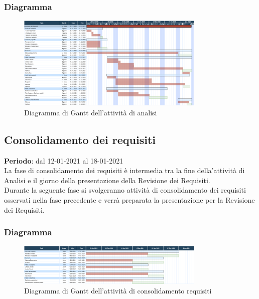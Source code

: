 	\subsubsection{Diagramma}
		\begin{figure}[H]
        		\centering
        		\includegraphics[width=0.8\textwidth]{source/img/analisiattivita.png}
        		\caption{Diagramma di Gantt dell'attività di analisi}
    		\end{figure}

	\subsection{Consolidamento dei requisiti}
	\textbf{Periodo}: dal 12-01-2021 al 18-01-2021 \\
	La fase di consolidamento dei requisiti è intermedia tra la fine della'attività di Analisi e il giorno della presentazione della Revisione dei Requisiti. \\
	Durante la seguente fase si svolgeranno attività di consolidamento dei requisiti osservati nella fase precedente e verrà preparata la presentazione per la Revisione dei Requisiti.
	
	\subsubsection{Diagramma}
		\begin{figure}[H]
        		\centering
        		\includegraphics[width=0.8\textwidth]{source/img/Consolidamento_Requisiti.png}
        		\caption{Diagramma di Gantt dell'attività di consolidamento requisiti}
    		\end{figure}
	
